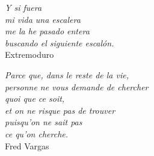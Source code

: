 \thispagestyle{empty}

\vspace*{\fill}
\begin{flushleft}
\textit{Y si fuera \\
mi vida una escalera \\
me la he pasado entera \\
buscando el siguiente escal\'on.} \\
\vspace{0.05in}
Extremoduro
\end{flushleft}

\vspace*{\fill}
\begin{flushright}
\textit{Parce que, dans le reste de la vie, \\
personne ne vous demande de chercher \\
quoi que ce soit,\\
et on ne risque pas de trouver\\
puisqu'on ne sait pas \\
ce qu'on cherche.} \\
\vspace{0.05in}
Fred Vargas
\end{flushright}
\vspace*{\fill}




